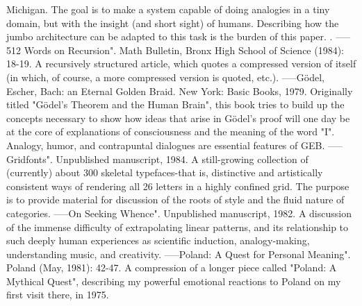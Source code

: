   Michigan. The goal is to make a system capable of doing analogies in a tiny domain, but
  with the insight (and short sight) of humans. Describing how the jumbo architecture can be
  adapted to this task is the burden of this paper. .
-----512 Words on Recursion". Math Bulletin, Bronx High School of Science (1984): 18-19.
  A recursively structured article, which quotes a compressed version of itself (in which, of
  course, a more compressed version is quoted, etc.).
-----Gödel, Escher, Bach: an Eternal Golden Braid. New York: Basic Books, 1979. Originally
  titled "Gödel’s Theorem and the Human Brain", this book tries to build up the concepts
  necessary to show how ideas that arise in Gödel’s proof will one day be at the core of
  explanations of consciousness and the meaning of the word "I". Analogy, humor, and
  contrapuntal dialogues are essential features of GEB.
-----Gridfonts". Unpublished manuscript, 1984. A still-growing collection of (currently) about
  300 skeletal typefaces-that is, distinctive and artistically consistent ways of rendering all 26
  letters in a highly confined grid. The purpose is to provide material for discussion of the
  roots of style and the fluid nature of categories.
-----On Seeking Whence". Unpublished manuscript, 1982. A discussion of the immense
  difficulty of extrapolating linear patterns, and its relationship to such deeply human
  experiences as scientific induction, analogy-making, understanding music, and creativity.
-----Poland: A Quest for Personal Meaning". Poland (May, 1981): 42-47. A compression of a
  longer piece called "Poland: A Mythical Quest", describing my powerful emotional
  reactions to Poland on my first visit there, in 1975.


